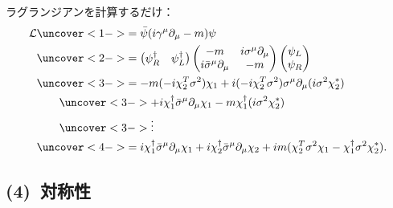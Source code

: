 \documentclass[pdflatex,unicode,ja=standard,12pt]{beamer}
\begin{document}
\begin{frame}
  
  \frametitle{\subsecname}

  ラグランジアンを計算するだけ：
  \begin{align}
    \mathcal{L}
    &\uncover<1->{
      =
      \bar{\psi}(i\gamma^{\mu}\partial_{\mu}-m)\psi
    }
    \nonumber
    \\
    &
    \uncover<2->{
      =
      \begin{pmatrix}
        \psi_R^{\dag} & \psi_L^{\dag}
      \end{pmatrix}
      \begin{pmatrix}
        -m & i\sigma^{\mu}\partial_{\mu} \\
        i\bar{\sigma}^{\mu}\partial_{\mu} & -m
      \end{pmatrix}
      \begin{pmatrix}
        \psi_L \\
        \psi_R
      \end{pmatrix}
    }
    \nonumber
    \\
    &
    \uncover<3->{
      =
      -m(-i\chi_2^{T}\sigma^2)\chi_1
      +
      i(-i\chi_2^{T}\sigma^2)\sigma^{\mu}\partial_{\mu}(i\sigma^2\chi^{*}_2)
    }
    \nonumber
    \\
    &\qquad
    \uncover<3->{
      +
      i\chi^{\dag}_1\bar{\sigma}^{\mu}\partial_{\mu}\chi_1
      -
      m\chi^{\dag}_1(i\sigma^2\chi_2^{*})
    }
    \nonumber
    \\
    &\qquad\uncover<3->{\vdots}
    \nonumber
    \\
    &
    \uncover<4->{
      =
      i\chi^{\dag}_1\bar{\sigma}^{\mu}\partial_{\mu}\chi_1
      +
      i\chi^{\dag}_2\bar{\sigma}^{\mu}\partial_{\mu}\chi_2
      +
      im
      (
        \chi_2^{T}\sigma^2\chi_1
        -
        \chi_1^{\dag}\sigma^2\chi_2^{*}
      )
      .
    }
    \label{lagrangian}
  \end{align}

\end{frame}


\subsection{(4)\ 対称性}
\end{document}
